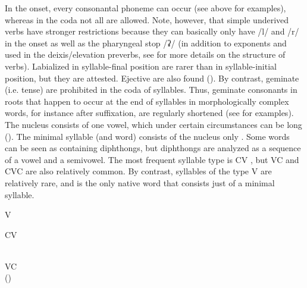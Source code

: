 In the onset, every consonantal phoneme can occur (see  above for examples), whereas in the coda not all  are allowed. Note, however, that simple underived verbs have stronger restrictions because they can basically only have /l/ and /r/ in the onset as well as the pharyngeal stop /ʡ/ (in addition to  exponents and  used in the deixis/elevation preverbs, see  for more details on the structure of verbs). Labialized  in syllable-final position are rarer than in syllable-initial position, but they are attested. Ejective  are also found (). By contrast, geminate (i.e. tense)  are prohibited in the coda of syllables. Thus, geminate consonants in roots that happen to occur at the end of syllables in morphologically complex words, for instance after suffixation, are regularly shortened (see  for examples). The nucleus consists of one vowel, which under certain circumstances can be long (). The minimal syllable (and word) consists of the nucleus only . Some words can be seen as containing diphthongs, but diphthongs are analyzed as a sequence of a vowel and a semivowel. The most frequent syllable type is CV , but VC  and CVC  are also relatively common. By contrast, syllables of the type V are relatively rare, and   is the only native word that consists just of a minimal syllable.
%
\begin{exe}
\TabPositions{11em}
	\ex	V	\label{ex:syllable V phon} \\
		 	 \tab {} 	
\end{exe}	

\begin{exe}
\TabPositions{11em}
	\ex	CV	\label{ex:syllable CV phon} \\
		 	\tab {} 	\\
		  	\tab{} 		
		 	\tab {} 	
\end{exe}	

\begin{exe}
\TabPositions{11em}
	\ex	VC	\label{ex:syllable VC phon} \\
		 	() \tab {} 	
\end{exe}

